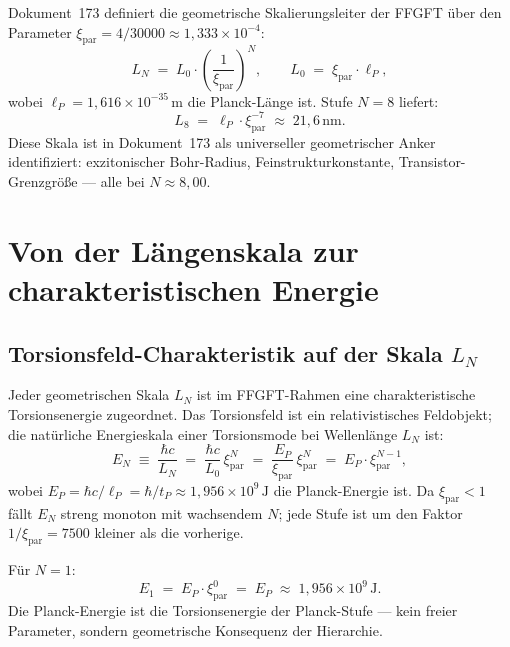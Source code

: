 	Dokument~173 definiert die geometrische Skalierungsleiter der FFGFT
	über den Parameter $\xi_\text{par} = 4/30000 \approx 1{,}333\times10^{-4}$:
	\begin{equation}
		L_N \;=\; L_0 \cdot \left(\frac{1}{\xi_\text{par}}\right)^{\!N},
		\qquad L_0 \;=\; \xi_\text{par}\cdot \ell_P,
		\label{eq:laengenhierarchie}
	\end{equation}
	wobei $\ell_P = 1{,}616\times10^{-35}\,\text{m}$ die Planck-Länge ist.
	Stufe $N=8$ liefert:
	\begin{equation}
		L_8 \;=\; \ell_P\cdot\xi_\text{par}^{-7}
		\;\approx\; 21{,}6\,\text{nm}.
		\label{eq:L8}
	\end{equation}
	Diese Skala ist in Dokument~173 als universeller geometrischer Anker
	identifiziert: exzitonischer Bohr-Radius, Feinstrukturkonstante,
	Transistor-Grenzgröße --- alle bei $N \approx 8{,}00$.
	
	\section{Von der Längenskala zur charakteristischen Energie}
	\label{sec:energie-herleitung}
	
	\subsection{Torsionsfeld-Charakteristik auf der Skala
		\texorpdfstring{$L_N$}{L\_N}}
	\label{subsec:torsionsenergie}
	
	Jeder geometrischen Skala $L_N$ ist im FFGFT-Rahmen eine charakteristische
	Torsionsenergie zugeordnet. Das Torsionsfeld ist ein relativistisches
	Feldobjekt; die natürliche Energieskala einer Torsionsmode bei
	Wellenlänge $L_N$ ist:
	\begin{equation}
		E_N \;\equiv\; \frac{\hbar c}{L_N}
		\;=\; \frac{\hbar c}{L_0}\,\xi_\text{par}^{N}
		\;=\; \frac{E_P}{\xi_\text{par}}\,\xi_\text{par}^{N}
		\;=\; E_P\cdot\xi_\text{par}^{N-1},
		\label{eq:energie-hierarchie}
	\end{equation}
	wobei $E_P = \hbar c/\ell_P = \hbar/t_P \approx 1{,}956\times10^9\,\text{J}$
	die Planck-Energie ist. Da $\xi_\text{par} < 1$ fällt $E_N$ streng
	monoton mit wachsendem $N$; jede Stufe ist um den Faktor
	$1/\xi_\text{par} = 7500$ kleiner als die vorherige.
	
	\begin{keyresult}[Verifikation: $N=1$ liefert die Planck-Energie]
		Für $N = 1$:
		\begin{equation}
			E_1 \;=\; E_P \cdot \xi_\text{par}^{0} \;=\; E_P
			\;\approx\; 1{,}956\times10^9\,\text{J}.
		\end{equation}
		Die Planck-Energie ist die Torsionsenergie der Planck-Stufe --- kein
		freier Parameter, sondern geometrische Konsequenz der Hierarchie.
	\end{keyresult}
	
